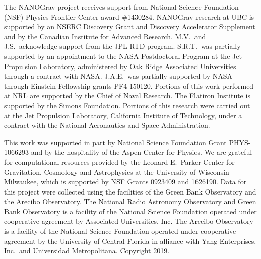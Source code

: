The NANOGrav project receives support from National Science Foundation (NSF) Physics Frontier Center award \#1430284.
NANOGrav research at UBC is supported by an NSERC Discovery Grant and Discovery Accelerator Supplement and by the Canadian Institute for Advanced Research.
M.V.\ and J.S.\ acknowledge support from the JPL RTD program.
S.R.T.\ was partially supported by an appointment to the NASA Postdoctoral Program at the Jet Propulsion Laboratory, administered by Oak Ridge Associated Universities through a contract with NASA.
J.A.E.\ was partially supported by NASA through Einstein Fellowship grants PF4-150120.
Portions of this work performed at NRL are supported by the Chief of Naval Research.
The Flatiron Institute is supported by the Simons Foundation.
Portions of this research were carried out at the Jet Propulsion Laboratory, California Institute of Technology, under a contract with the National Aeronautics and Space Administration.
\par

This work was supported in part by National Science Foundation Grant PHYS-1066293 and by the hospitality of the Aspen Center for Physics.
We are grateful for computational resources provided by the Leonard E.\ Parker Center for Gravitation, Cosmology and Astrophysics at the University of Wisconsin-Milwaukee, which is supported by NSF Grants 0923409 and 1626190.
Data for this project were collected using the facilities of the Green Bank Observatory and the Arecibo Observatory.
The National Radio Astronomy Observatory and Green Bank Observatory is a facility of the National Science Foundation operated under cooperative agreement by Associated Universities, Inc.
The Arecibo Observatory is a facility of the National Science Foundation operated under cooperative agreement by the University of Central Florida in alliance with Yang Enterprises, Inc.\ and Universidad Metropolitana.
Copyright 2019.
